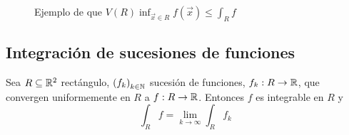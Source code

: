 \begin{figure}[H]\label{fig:cotaInferior} 
   \centering
   
   \caption{Ejemplo de que $V(R) \inf_{\vec{x} \in R} f(\vec{x}) \leq \int_R f $}
\end{figure}

\subsection{Integraci\'on de sucesiones de funciones}

\begin{proposicion}
Sea $ R \subseteq \mathbb{R}^2 $ rect\'angulo, ${(f_k)}_{k \in \mathbb{N}}$ sucesi\'on de funciones, $f_k : R \to \mathbb{R}$, que convergen uniformemente en $ R $ a $ f: R \to \mathbb{R} $. Entonces $ f $ es integrable en $ R $ y
    \[ \int_R f = \lim_{k \to \infty} \int_R f_k \]
\end{proposicion}

